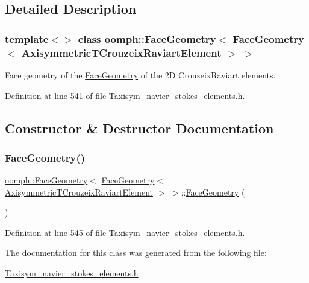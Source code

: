\subsection{Detailed Description}
\subsubsection*{template$<$$>$\newline
class oomph\+::\+Face\+Geometry$<$ Face\+Geometry$<$ Axisymmetric\+T\+Crouzeix\+Raviart\+Element $>$ $>$}

Face geometry of the \hyperlink{classoomph_1_1FaceGeometry}{Face\+Geometry} of the 2D Crouzeix\+Raviart elements. 

Definition at line 541 of file Taxisym\+\_\+navier\+\_\+stokes\+\_\+elements.\+h.



\subsection{Constructor \& Destructor Documentation}
\mbox{\label{classoomph_1_1FaceGeometry_3_01FaceGeometry_3_01AxisymmetricTCrouzeixRaviartElement_01_4_01_4_a8837435e662313959c48a378eb8da77c}} 
\subsubsection{\texorpdfstring{Face\+Geometry()}{FaceGeometry()}}
{\footnotesize\ttfamily \hyperlink{classoomph_1_1FaceGeometry}{oomph\+::\+Face\+Geometry}$<$ \hyperlink{classoomph_1_1FaceGeometry}{Face\+Geometry}$<$ \hyperlink{classoomph_1_1AxisymmetricTCrouzeixRaviartElement}{Axisymmetric\+T\+Crouzeix\+Raviart\+Element} $>$ $>$\+::\hyperlink{classoomph_1_1FaceGeometry}{Face\+Geometry} (\begin{DoxyParamCaption}{ }\end{DoxyParamCaption})\hspace{0.3cm}{\ttfamily [inline]}}



Definition at line 545 of file Taxisym\+\_\+navier\+\_\+stokes\+\_\+elements.\+h.



The documentation for this class was generated from the following file\+:\begin{DoxyCompactItemize}
\item 
\hyperlink{Taxisym__navier__stokes__elements_8h}{Taxisym\+\_\+navier\+\_\+stokes\+\_\+elements.\+h}\end{DoxyCompactItemize}
